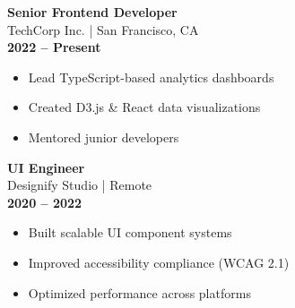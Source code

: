 
\vspace{5pt}

\hspace{0.5cm}
\begin{minipage}[t]{6.5cm}
\textbf{\large Senior Frontend Developer} \\
TechCorp Inc. | San Francisco, CA \\
\textbf{2022 -- Present}
\begin{itemize}[leftmargin=15pt, itemsep=2pt, topsep=5pt]
  \item Lead TypeScript-based analytics dashboards
  \item Created D3.js \& React data visualizations
  \item Mentored junior developers
\end{itemize}
\end{minipage}

\vspace{15pt}

\hspace{0.5cm}
\begin{minipage}[t]{6.5cm}
\textbf{\large UI Engineer} \\
Designify Studio | Remote \\
\textbf{2020 -- 2022}
\begin{itemize}[leftmargin=15pt, itemsep=2pt, topsep=5pt]
  \item Built scalable UI component systems
  \item Improved accessibility compliance (WCAG 2.1)
  \item Optimized performance across platforms
\end{itemize}
\end{minipage}

\vspace{15pt}


